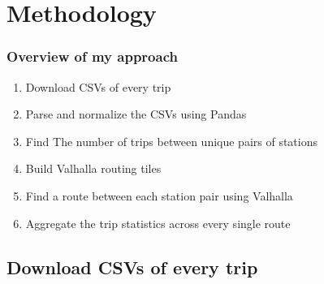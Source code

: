 \documentclass{beamer}
\begin{document}
\section{Methodology}

\begin{frame}
    \frametitle{Overview of my approach}
    \begin{enumerate}
        \item Download CSVs of every trip
        \item Parse and normalize the CSVs using Pandas
        \item Find The number of trips between unique pairs of stations
        \item Build Valhalla routing tiles
        \item Find a route between each station pair using Valhalla
        \item Aggregate the trip statistics across every single route
    \end{enumerate}
\end{frame}
\subsection{Download CSVs of every trip}
\end{document}
